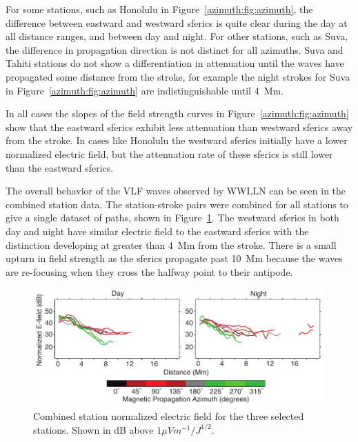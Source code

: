 For some stations, such as Honolulu in Figure~\ref{azimuth:fig:azimuth}, the difference between eastward and westward sferics is quite clear during the day at all distance ranges, and between day and night.
For other stations, such as Suva, the difference in propagation direction is not distinct for all azimuths.
Suva and Tahiti stations do not show a differentiation in attenuation until the waves have propagated some distance from the stroke, for example the night strokes for Suva in Figure~\ref{azimuth:fig:azimuth} are indistinguishable until 4~Mm.

In all cases the slopes of the field strength curves in Figure~\ref{azimuth:fig:azimuth} show that the eastward sferics exhibit less attenuation than westward sferics away from the stroke.
In cases like Honolulu the westward sferics initially have a lower normalized electric field, but the attenuation rate of these sferics is still lower than the eastward sferics.
  
The overall behavior of the VLF waves observed by WWLLN can be seen in the combined station data.
The station-stroke pairs were combined for all stations to give a single dataset of paths, shown in Figure~\ref{azimuth:fig:azimuthAverage}.
The westward sferics in both day and night have similar electric field to the eastward sferics with the distinction developing at greater than 4~Mm from the stroke.
There is a small upturn in field strength as the sferics propagate past 10~Mm because the waves are re-focusing when they cross the halfway point to their antipode.

\begin{figure}[h!t]
    \centering
    \includegraphics[scale=1]{Azimuth/Figures/azimuthAverage.pdf} 
    \caption{Combined station normalized electric field for the three selected stations.
    	Shown in dB above $1 \mu Vm^{-1}/J^{1/2}$.}
    \label{azimuth:fig:azimuthAverage}
 \end{figure}

